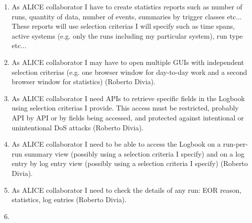 \begin{enumerate}
  \item As ALICE collaborator I have to create statistics reports such as number of runs, quantity of data, number of events, summaries by trigger classes etc... These reports will use selection criterias I will specify such as time spans, active systems (e.g. only the runs including my particular system), run type etc...
\item As ALICE collaborator I may have to open multiple GUIs with independent selection criterias (e.g. one browser window for day-to-day work and a second browser window for statistics) (Roberto Divia).
\item As ALICE collaborator I need APIs to retrieve specific fields in the Logbook using selection criterias I provide. This access must be restricted, probably API by API or by fields being accessed, and protected against intentional or unintentional DoS attacks (Roberto Divia).
\item As ALICE collaborator I need to be able to access the Logbook on a run-per-run summary view (possibly using a selection criteria I specify) and on a log entry by log entry view (possibly using a selection criteria I specify) (Roberto Divia).
\item As ALICE collaborator I need to check the details of any run: EOR reason, statistics, log entries (Roberto Divia).

  \item 
\end{enumerate}

